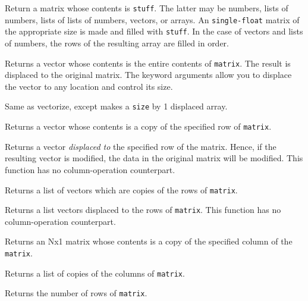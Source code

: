 \begin{description}

\item{}
Return a matrix whose contents is {\tt stuff}.
The latter may be numbers, lists of numbers,
lists of lists of numbers, vectors, or arrays.
An {\tt single-float} matrix of the appropriate size is made
and filled with {\tt stuff}. 
In the case of vectors and lists of numbers, 
the rows of the resulting array are filled in order.

\item{}
Returns a vector whose contents is the entire contents
of {\tt matrix}. The result is displaced to the original matrix.
The keyword arguments allow you to displace the vector to any location
and control its size.

\item{}
Same as vectorize, except makes a {\tt size} by 1 displaced array.

\item{}
Returns a vector whose contents is a copy of 
the specified row of {\tt matrix}.

\item{}
Returns a vector {\em displaced to} the specified row of the matrix.
Hence, if the resulting vector is modified, 
the data in the original matrix will be modified.
This function has no column-operation counterpart.

\item{}
Returns a list of vectors which are copies 
of the rows of {\tt matrix}.

\item{}
Returns a list vectors displaced to the rows of {\tt matrix}.
This function has no column-operation counterpart.

\item{}
Returns an Nx1 matrix whose contents is a copy of 
the specified column of the {\tt matrix}.

\item{}
Returns a list of copies of the columns of {\tt matrix}.

\item{}
Returns the number of rows of {\tt matrix}.

\item{}


\end{description}

